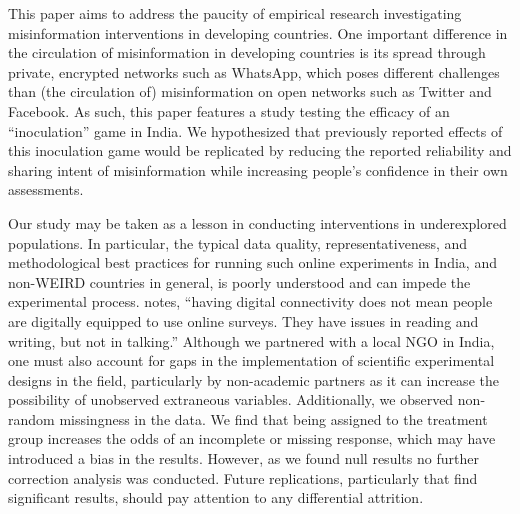 \documentclass[empirical, authordate]{jote-new-article}
\begin{document}
\begin{originalPurpose}
  This paper aims to address the paucity of empirical research investigating misinformation interventions in developing countries. One important difference in the circulation of misinformation in developing countries is its spread through private, encrypted networks such as \mbox{WhatsApp}, which poses different challenges than (the circulation of) misinformation on open networks such as Twitter and Facebook. As such, this paper features a study testing the efficacy of an “inoculation” game in India. We hypothesized that previously reported effects of this inoculation game would be replicated by reducing the reported reliability and sharing intent of misinformation while increasing people's confidence in their own assessments.
\end{originalPurpose}

Our study may be taken as a lesson in conducting interventions in underexplored populations. In particular, the typical data quality, representativeness, and methodological best practices for running such online experiments in India, and non-WEIRD countries in general, is poorly understood and can impede the experimental process. \textcite{Campbell-Smith2019} notes, “having digital connectivity does not mean people are digitally equipped to use online surveys. They have issues in reading and writing, but not in talking.” Although we partnered with a local NGO in India, one must also account for gaps in the implementation of scientific experimental designs in the field, particularly by non-academic partners as it can increase the possibility of unobserved extraneous variables. Additionally, we observed non-random missingness in the data. We find that being assigned to the treatment group increases the odds of an incomplete or missing response, which may have introduced a bias in the results. However, as we found null results no further correction analysis was conducted. Future replications, particularly that find significant results, should pay attention to any differential attrition.
\end{document}
